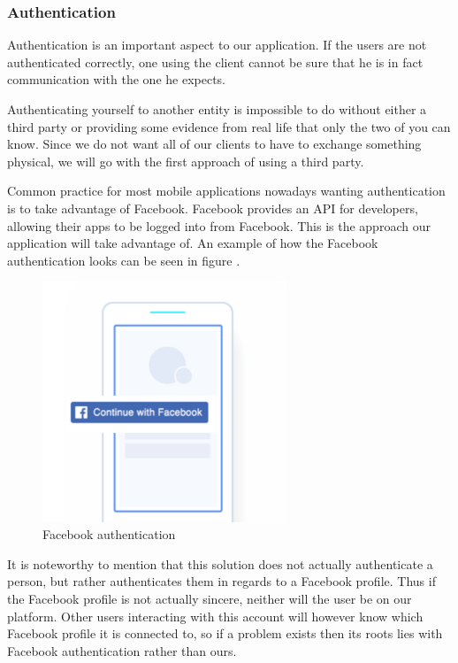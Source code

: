 
\subsubsection{Authentication} \label{sec:authencticationChallenge}

Authentication is an important aspect to our application. If the users are not authenticated correctly, one using the client cannot be sure that he is in fact communication with the one he expects. \smallskip

Authenticating yourself to another entity is impossible to do without either a third party or providing some evidence from real life that only the two of you can know. Since we do not want all of our clients to have to exchange something physical, we will go with the first approach of using a third party. \smallskip

Common practice for most mobile applications nowadays wanting authentication is to take advantage of Facebook. Facebook provides an API for developers, allowing their apps to be logged into from Facebook. This is the approach our application will take advantage of. An example of how the Facebook authentication looks can be seen in figure .

\begin{figure}[H]
    \centering
    \includegraphics[width=0.65\textwidth]{images/FacebookLogin.png}
    \caption{Facebook authentication \cite{facebookApi}}
    \label{fig:FacebookAuthentication}
\end{figure}

It is noteworthy to mention that this solution does not actually authenticate a person, but rather authenticates them in regards to a Facebook profile. Thus if the Facebook profile is not actually sincere, neither will the user be on our platform. Other users interacting with this account will however know which Facebook profile it is connected to, so if a problem exists then its roots lies with Facebook authentication rather than ours.